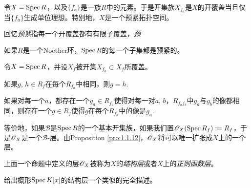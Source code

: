\begin{lem}
	令$X=\operatorname{Spec} R$，以及$\{f_a\}$是一族$R$中的元素。于是开集族$X_{f_a}$是$X$的开覆盖当且仅当$\{f_a\}$生成单位理想。特别地，$X$是一个预紧拓扑空间。
\end{lem}

回忆\textit{预紧}指每一个开覆盖都有有限子覆盖，\textit{预}

\begin{exe}
如果$R$是一个Noether环，$\operatorname{Spec} R$的每一个子集都是预紧的。
\end{exe}

\begin{pro}\label{pro:1.1.18}
令$X=\operatorname{Spec} R$，并设$X_f$被开集$X_{f_a}\subset X_f$所覆盖。
\begin{compactenum}[$(a)$]
\item 如果$g$, $h\in R_f$在每个$R_{f_a}$中相同，则$g=h$.
\item 如果对每一个$a$，都存在一个$g_a\in R_{f_a}$使得对每一对$a$, $b$，$R_{f_af_b}$中$g_a$与$g_b$的像都相同，则存在一个$g\in R_f$使得$g$在每个$R_{f_a}$中的像是$g_a$.
\end{compactenum}
\end{pro}

等价地，如果$\mathscr{B}$是$\operatorname{Spec} R$的一个基本开集族，如果我们置$\mathscr{O}_X(\operatorname{Spec} R_f):=R_f$，于是$\mathscr{O}_X$是一个$\mathscr{B}$\hyp 层。由Proposition \ref{pro:1.1.12}，$\mathscr{O}_X$将可以唯一扩张成$X$上的一个层。

\begin{defi}
	上面一个命题中定义的层$\mathscr{O}_X$被称为$X$的\textit{结构层}或者$X$上的\textit{正则函数层}。
\end{defi}

\begin{exe}
	给出概形$\operatorname{Spec} K[x]$的结构层一个类似的完全描述。
\end{exe}
